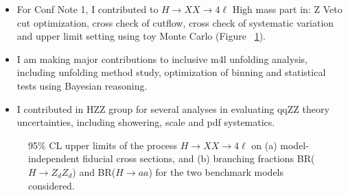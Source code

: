 \begin{itemize}
        \begin{itemize}
       	 \item For Conf Note 1, I contributed to $H \rightarrow XX \rightarrow 4\ell$ High mass part in: Z Veto cut optimization, cross check of cutflow, cross check of systematic variation and upper limit setting using toy Monte Carlo (Figure ~\ref{fig:Rongkun_ZdZd_Limit}).
        \end{itemize}
        
        \begin{itemize}
       	 \item I am making major contributions to inclusive m4l unfolding analysis, including unfolding method study, optimization of binning and statistical tests using Bayesian reasoning.
        \end{itemize}
        
        \begin{itemize}
       	 \item I contributed in HZZ group for several analyses in evaluating qqZZ theory uncertainties, including showering, scale and pdf systematics.
        \end{itemize}
	 
        \begin{figure}[!htbp]
        \begin{center}
            \caption{95\% CL upper limits of the process $H \rightarrow XX \rightarrow 4\ell$ on (a) model-independent fiducial cross sections, and (b) branching fractions BR($H\rightarrow Z_{d}Z_{d}$) and BR($H\rightarrow aa$) for the two benchmark models considered.}
                \label{fig:Rongkun_ZdZd_Limit}
        \end{center}
        \end{figure}

\end{itemize}
